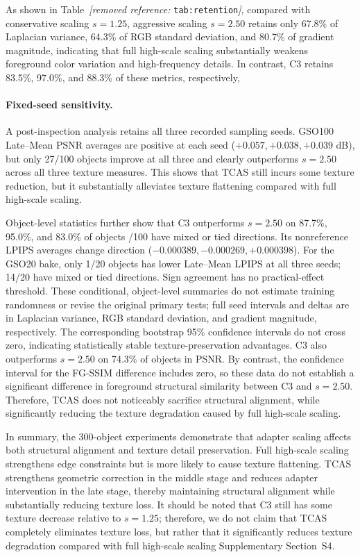 \documentclass[times,twocolumn,final]{elsarticle}
\providecommand{\DIFadd}[1]{{\protect\color{blue} \sf #1}} %
\providecommand{\DIFdel}[1]{{\protect\color{red} \scriptsize #1}} %
\providecommand{\DIFaddbegin}{} %
\providecommand{\DIFaddend}{} %
\providecommand{\DIFdelbegin}{} %
\providecommand{\DIFdelend}{} %
\begin{document}
\DIFdelbegin \DIFdel{As shown in Table~\textit{[removed reference: }\texttt{tab:retention}\textit{]}, compared with conservative scaling $s = 1.25$, aggressive scaling $s = 2.50$ retains only 67.8\% of Laplacian variance, 64.3\% of RGB standard deviation, and 80.7\% of gradient magnitude, indicating that full high-scale scaling substantially weakens foreground color variation and high-frequency details. In contrast, C3 retains 83.5\%, 97.0\%, and 88.3\% of these metrics, respectively, }\DIFdelend \DIFaddbegin \paragraph{Fixed-seed sensitivity.}
\DIFadd{A post-inspection analysis retains all three recorded sampling seeds. GSO100 Late--Mean PSNR averages are positive at each seed ($+0.057,+0.038,+0.039$ dB), but only 27/100 objects improve at all three }\DIFaddend and \DIFdelbegin \DIFdel{clearly outperforms $s = 2.50$ across all three texture measures. This shows that TCAS still incurs some texture reduction, but it substantially alleviates texture flattening compared with full high-scale scaling.
}%

\DIFdel{Object-level statistics further show that C3 outperforms $s = 2.50$ on 87.7\%, 95.0\%, and 83.0\% of objects }\DIFdelend \DIFaddbegin \DIFadd{68/100 have mixed or tied directions. Its nonreference LPIPS averages change direction ($-0.000389,-0.000269,+0.000398$). For the GSO20 bake, only 1/20 objects has lower Late--Mean LPIPS at all three seeds; 14/20 have mixed or tied directions. Sign agreement has no practical-effect threshold. These conditional, object-level summaries do not estimate training randomness or revise the original primary tests; full seed intervals and deltas are }\DIFaddend in \DIFdelbegin \DIFdel{Laplacian variance, RGB standard deviation, and gradient magnitude, respectively.
The corresponding bootstrap 95\% confidence intervals do not cross zero, indicating statistically stable texture-preservation advantages. C3 also outperforms $s = 2.50$ on 74.3\% of objects in PSNR. By contrast, the confidence interval for the FG-SSIM difference includes zero, so these data do not establish a significant difference in foreground structural similarity between C3 and $s = 2.50$. Therefore, TCAS does not noticeably sacrifice structural alignment, while significantly reducing the texture degradation caused by full high-scale scaling. }%

\DIFdel{In summary, the 300-object experiments demonstrate that adapter scaling affects both structural alignment and texture detail preservation. Full high-scale scaling strengthens edge constraints but is more likely to cause texture flattening. TCAS strengthens geometric correction in the middle stage and reduces adapter intervention in the late stage, thereby maintaining structural alignment while substantially reducing texture loss. It should be noted that C3 still has some texture decrease relative to $s = 1.25$; therefore, we do not claim that TCAS completely eliminates texture loss, but rather that it significantly reduces texture degradation compared with full high-scale scaling}\DIFdelend \DIFaddbegin \DIFadd{Supplementary Section~S4}\DIFaddend .
\end{document}
